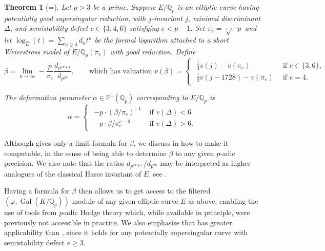 \documentclass{amsart}
\newcommand{\op}[1]{\operatorname{#1}}
\newcommand{\Qp}{\mathbb{Q}_p}
\newtheorem{theorem}{Theorem}
\theoremstyle{definition}
\newcommand{\Q}{\mathbb{Q}}
\numberwithin{theorem}{section}
\numberwithin{equation}{section}
\begin{document}
\begin{theorem}[=]\label{introthm: formula for beta}
Let $p>3$ be a prime. Suppose $E/\Qp$ is an elliptic curve having potentially good supersingular reduction, with $j$-invariant $j$, minimal discriminant $\Delta$, and semistability defect $e \in \{3,4,6\}$ satisfying $e<p-1$. Set $\pi_e=\sqrt[e]{-p}$ and let $\log_{\hat{E}}(t)=\sum_{n \ge 0} d_nt^n$ be the formal logarithm attached to a short Weierstrass model of $E/\Qp(\pi_e)$ with good reduction. Define
\[
\beta = \lim_{k \to \infty} -\frac{p}{\pi_e} \frac{d_{p^{2k+1}}}{d_{p^{2k}}}, \qquad \text{which has valuation } v(\beta)=\begin{cases}
\begin{array}{lll}
\frac{1}{3}v(j) - v(\pi_e) & \, \text{ if $e \in \{3,6\}$}, \\
\frac{1}{2}v(j-1728) - v(\pi_e) & \,  \text{ if $e =4$.}
\end{array}
\end{cases}
\]

The deformation parameter $\alpha \in \mathbb{P}^1(\Qp)$ corresponding to $E/\Qp$ is
\[
\alpha = \begin{cases}
\begin{array}{cc}
    -p \cdot (\beta/\pi_e)^{-1} & \text{ if } v(\Delta)<6 \\
    -p \cdot \beta/\pi_e^{e-3} & \text{ if } v(\Delta)>6.
    \end{array}
\end{cases}
\]
\end{theorem}


Although  gives only a limit formula for $\beta$, we discuss in  how to make it computable, in the sense of being able to determine $\beta$ to any given $p$-adic precision. We also note that the ratios $d_{p^{2k+1}}/d_{p^{2k}}$ may be interpreted as higher analogues of the classical Hasse invariant of $E$, see .

Having a formula for $\beta$ then allows us to get access to the filtered $(\varphi, \op{Gal}(K/\Q_p))$-module of any given elliptic curve $E$ as above, enabling the use of tools from $p$-adic Hodge theory which, while available in principle, were previously not accessible in practice. We also emphasise that  has greater applicability than , since it holds for any potentially supersingular curve with semistability defect $e \geq 3$.
\end{document}
